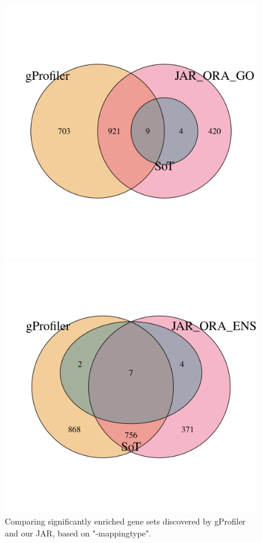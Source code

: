 \documentclass[12pt]{article}
\begin{document}
\begin{figure}[H]
    \centering
    \begin{minipage}{0.49\textwidth}
        \centering
        \includegraphics[width=\textwidth]{./plots/go_mappingCompgProfiler.png}
    \end{minipage}
    \hfill
    \begin{minipage}{0.49\textwidth}
        \centering
        \includegraphics[width=\textwidth]{./plots/ens_mappingCompgProfiler.png}
    \end{minipage}
    \caption{Comparing significantly enriched gene sets discovered by gProfiler and our JAR, based on "-mappingtype".} 
    \label{fig:comp-gProfiler}
\end{figure}
\end{document}
